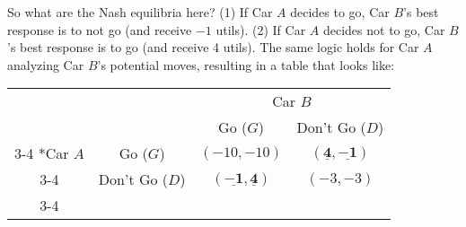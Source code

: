 So what are the Nash equilibria here? (1) If Car $A$ decides to go, Car $B$'s best response is to not go (and receive $-1$ utils). (2) If Car $A$ decides not to go, Car $B$'s best response is to go (and receive 4 utils). The same logic holds for Car $A$ analyzing Car $B$'s potential moves, resulting in a table that looks like:
\begin{table}[ht!]
	\centering
	\setlength{\extrarowheight}{2pt}
	\begin{tabular}{cc|c|c|}
		& \multicolumn{1}{c}{} & \multicolumn{2}{c}{Car $B$}\\
		& \multicolumn{1}{c}{} & \multicolumn{1}{c}{Go ($G$)}  & \multicolumn{1}{c}{Don't Go ($D$)} \\\cline{3-4}
		\multirow{2}*{Car $A$}  & Go ($G$) & $(-10,-10)$ & $(\underline{\mathbf{4}},\underline{\mathbf{-1}})$ \\\cline{3-4}
		& Don't Go ($D$) & $(\underline{\mathbf{-1}},\underline{\mathbf{4}})$ & $(-3,-3)$ \\\cline{3-4}
	\end{tabular}
	\label{fig:slnash}
\end{table}
